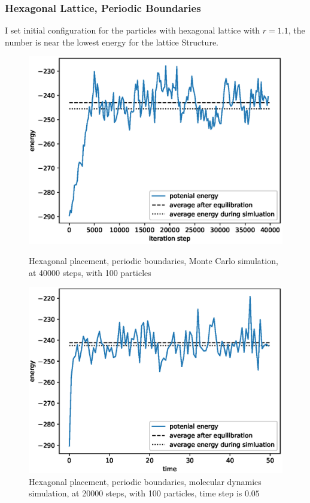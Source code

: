 \documentclass[UTF8,a4paper]{article}
\begin{document}
\subsubsection{Hexagonal Lattice, Periodic Boundaries}
I set initial configuration for the particles with hexagonal lattice with $r = 1.1$, the number is near the lowest energy for the lattice Structure.
\begin{figure}[H]
	\centering
	\begin{minipage}[t]{0.45\textwidth}
		\centering
		\includegraphics[height=0.2\textheight]{fig/plot_40000_steps_100_particles_0.8442_rho_0.728_tempure_1.eps}
		\caption{Hexagonal placement, periodic boundaries, Monte Carlo simulation, at 40000 steps, with 100 particles}
	\end{minipage}\hspace{0.5cm}
	\begin{minipage}[t]{0.45\textwidth}
		\centering
		\includegraphics[height=0.2\textheight]{fig/md_plot_norand__10000_steps_100_particles_0.8442_rho_0.728_tempure_.eps}
		\caption{Hexagonal placement, periodic boundaries, molecular dynamics simulation, at 20000 steps, with 100 particles, time step is $0.05$}
	\end{minipage}
\end{figure}
\end{document}
